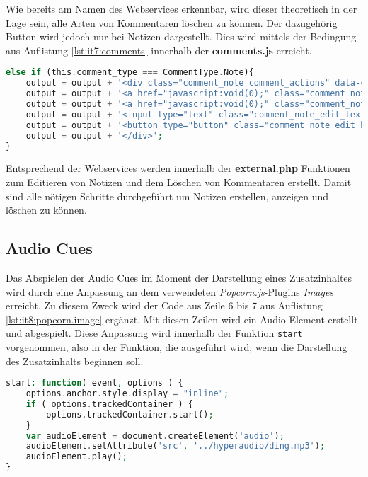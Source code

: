  Wie bereits am Namen des Webservices erkennbar, wird dieser theoretisch in der Lage sein, alle Arten von Kommentaren löschen zu können. Der dazugehörig Button wird jedoch nur bei Notizen dargestellt. Dies wird mittels der Bedingung aus Auflistung \ref{lst:it7:comments} innerhalb der \textbf{comments.js} erreicht.
 
\begin{lstlisting}[language=php,
             linewidth=\textwidth,
             caption={Ausschnitt der \textbf{comments.js} in der 7. Iteration},
             label={lst:it7:comments}]
else if (this.comment_type === CommentType.Note){
	output = output + '<div class="comment_note comment_actions" data-comment_id="'+this.id+'">';
	output = output + '<a href="javascript:void(0);" class="comment_note_edit_link comment_link" onclick="show_note_edit_input(this)" data-comment_id="'+this.id+'">' + string_edit + '</a>';
	output = output + '<a href="javascript:void(0);" class="comment_note_delete_link comment_link" data-comment_id="'+this.id+'">' + string_delete + '</a>';
	output = output + '<input type="text" class="comment_note_edit_text comment_hidden_element" data-comment_id="'+this.id+'"/>';
	output = output + '<button type="button" class="comment_note_edit_button comment_hidden_element" data-comment_id="'+this.id+'">' + string_edit + '</button>';
	output = output + '</div>';
}
\end{lstlisting}

Entsprechend der Webservices werden innerhalb der \textbf{external.php} Funktionen zum Editieren von Notizen und dem Löschen von Kommentaren erstellt. Damit sind alle nötigen Schritte durchgeführt um Notizen erstellen, anzeigen und löschen zu können.

\subsection{Audio Cues}
Das Abspielen der Audio Cues im Moment der Darstellung eines Zusatzinhaltes wird durch eine Anpassung an dem verwendeten \textit{Popcorn.js}-Plugins \textit{Images} erreicht. Zu diesem Zweck wird der Code aus Zeile 6 bis 7  aus Auflistung \ref{lst:it8:popcorn.image} ergänzt. Mit diesen Zeilen wird ein Audio Element erstellt und abgespielt. Diese Anpassung wird innerhalb der Funktion \texttt{start} vorgenommen, also in der Funktion, die ausgeführt wird, wenn die Darstellung des Zusatzinhalts beginnen soll.

\begin{lstlisting}[language=php,
             linewidth=\textwidth,
             caption={Ausschnitt der \textbf{popcorn.image.js} in der 8. Iteration},
             label={lst:it8:popcorn.image}]
start: function( event, options ) {
	options.anchor.style.display = "inline";
	if ( options.trackedContainer ) {
		options.trackedContainer.start();
	}
	var audioElement = document.createElement('audio');
	audioElement.setAttribute('src', '../hyperaudio/ding.mp3');
	audioElement.play();
}
\end{lstlisting}

